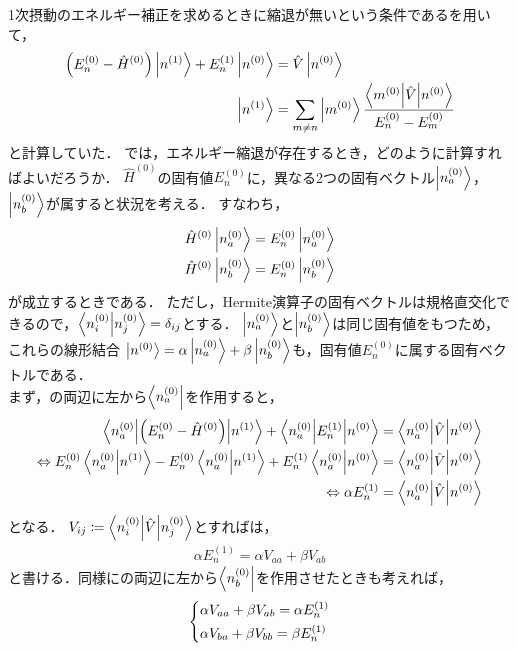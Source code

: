 \documentclass{report}
\begin{document}
  1次摂動のエネルギー補正を求めるときに縮退が無いという条件であるを用いて，
  \begin{align}
    \qty(E_n^{(0)} - \hat{H}^{(0)})\ket{n^{(1)}} + E_n^{(1)}\ket{n^{(0)}} &= \hat{V}\ket{n^{(0)}} \label{1st-order-perturbation-re-before} \\
    \ket{n^{(1)}} &= \sum_{m\neq n}\ket{m^{(0)}}\frac{\mel**{m^{(0)}}{\hat{V}}{n^{(0)}}}{E_n^{(0)} - E_m^{(0)}}\label{1st-order-perturbation-re-after}
  \end{align}
  と計算していた．
  では，エネルギー縮退が存在するとき，どのように計算すればよいだろうか．
  $\hat{H}^{(0)}$の固有値$E_n^{(0)}$に，異なる2つの固有ベクトル$\ket{n_a^{(0)}}$，$\ket{n_b^{(0)}}$が属すると状況を考える．
  すなわち，
  \begin{align}
    \hat{H}^{(0)}\ket{n_a^{(0)}} &= E_n^{(0)}\ket{n_a^{(0)}} \\
    \hat{H}^{(0)}\ket{n_b^{(0)}} &= E_n^{(0)}\ket{n_b^{(0)}}
  \end{align}
  が成立するときである．
  ただし，Hermite演算子の固有ベクトルは規格直交化できるので，$\braket{n_i^{(0)}}{n_j^{(0)}} = \delta_{ij}$とする．
  $\ket{n_a^{(0)}}$と$\ket{n_b^{(0)}}$は同じ固有値をもつため，これらの線形結合
  $\ket{n^{(0)}} = \alpha\ket{n_a^{(0)}} + \beta\ket{n_b^{(0)}}$も，固有値$E_n^{(0)}$に属する固有ベクトルである．\\
  まず，の両辺に左から$\bra{n_a^{(0)}}$を作用すると，
  \begin{align}
    \mel**{n_a^{(0)}}{\qty(E_n^{(0)} - \hat{H}^{(0)})}{n^{(1)}} + \mel**{n_a^{(0)}}{E_n^{(1)}}{n^{(0)}} &= \mel**{n_a^{(0)}}{\hat{V}}{n^{(0)}} \\ 
    \Leftrightarrow E_n^{(0)}\braket{n_a^{(0)}}{n^{(1)}} - E_n^{(0)}\braket{n_a^{(0)}}{n^{(1)}} + E_n^{(1)}\braket{n_a^{(0)}}{n^{(0)}} &= \mel**{n_a^{(0)}}{\hat{V}}{n^{(0)}} \\ 
    \Leftrightarrow \alpha E_n^{(1)} &= \mel**{n_a^{(0)}}{\hat{V}}{n^{(0)}}\label{degeneracy-ket-alpha}
  \end{align}
  となる．
  $V_{ij} \coloneqq \mel**{n^{(0)}_i}{\hat{V}}{n^{(0)}_j}$とすればは，
  \begin{align}
    \alpha E_n^{(1)} = \alpha V_{aa} + \beta V_{ab}
  \end{align}
  と書ける．同様にの両辺に左から$\bra{n_b^{(0)}}$を作用させたときも考えれば，
  \begin{align}
    \begin{dcases}
      \alpha V_{aa} + \beta V_{ab} = \alpha E_n^{(1)}\\
      \alpha V_{ba} + \beta V_{bb} = \beta E_n^{(1)}
    \end{dcases}
  \end{align}
\end{document}
